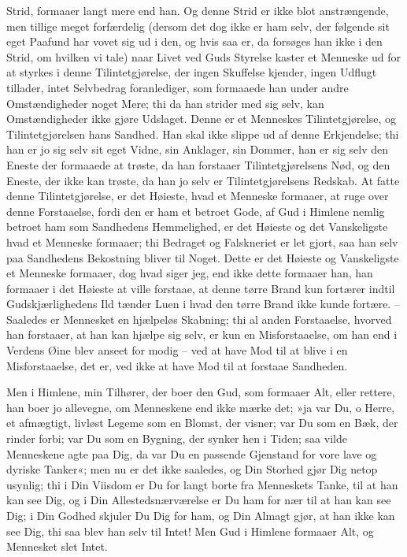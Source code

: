 \documentclass[12pt,a4paper]{article}
\begin{document}
Strid, formaaer langt mere end han. Og denne Strid er ikke blot anstrængende, men tillige meget forfærdelig (dersom det dog ikke er ham selv, der følgende sit eget Paafund har vovet sig ud i den, og hvis saa er, da forsøges han ikke i den Strid, om hvilken vi tale) naar Livet ved Guds Styrelse kaster et Menneske ud for at styrkes i denne Tilintetgjørelse, der ingen Skuffelse kjender, ingen Udflugt tillader, intet Selvbedrag foranlediger, som formaaede han under andre Omstændigheder noget Mere; thi da han strider med sig selv, kan Omstændigheder ikke gjøre Udslaget. Denne er et Menneskes Tilintetgjørelse, og Tilintetgjørelsen hans Sandhed. Han skal ikke slippe ud af denne Erkjendelse; thi han er jo sig selv sit eget Vidne, sin Anklager, sin Dommer, han er sig selv den Eneste der formaaede at trøste, da han forstaaer Tilintetgjørelsens Nød, og den Eneste, der ikke kan trøste, da han jo selv er Tilintetgjørelsens Redskab. At fatte denne Tilintetgjørelse, er det Høieste, hvad et Menneske formaaer, at ruge over denne Forstaaelse, fordi den er ham et betroet Gode, af Gud i Himlene nemlig betroet ham som Sandhedens Hemmelighed, er det Høieste og det Vanskeligste hvad et Menneske formaaer; thi Bedraget og Falskneriet er let gjort, saa han selv paa Sandhedens Bekostning bliver til Noget. Dette er det Høieste og Vanskeligste et Menneske formaaer, dog hvad siger jeg, end ikke dette formaaer han, han formaaer i det Høieste at ville forstaae, at denne tørre Brand kun fortærer indtil Gudskjærlighedens Ild tænder Luen i hvad den tørre Brand ikke kunde fortære. – Saaledes er Mennesket en hjælpeløs Skabning; thi al anden Forstaaelse, hvorved han forstaaer, at han kan hjælpe sig selv, er kun en Misforstaaelse, om han end i Verdens Øine blev anseet for modig – ved at have Mod til at blive i en Misforstaaelse, det er, ved ikke at have Mod til at forstaae Sandheden.

Men i Himlene, min Tilhører, der boer den Gud, som formaaer Alt, eller rettere, han boer jo allevegne, om Menneskene end ikke mærke det; »ja var Du, o Herre, et afmægtigt, livløst Legeme som en Blomst, der visner; var Du som en Bæk, der rinder forbi; var Du som en Bygning, der synker hen i Tiden; saa vilde Menneskene agte paa Dig, da var Du en passende Gjenstand for vore lave og dyriske Tanker«; men nu er det ikke saaledes, og Din Storhed gjør Dig netop usynlig; thi i Din Viisdom er Du for langt borte fra Menneskets Tanke, til at han kan see Dig, og i Din Allestedsnærværelse er Du ham for nær til at han kan see Dig; i Din Godhed skjuler Du Dig for ham, og Din Almagt gjør, at han ikke kan see Dig, thi saa blev han selv til Intet! Men Gud i Himlene formaaer Alt, og Mennesket slet Intet.
\end{document}
